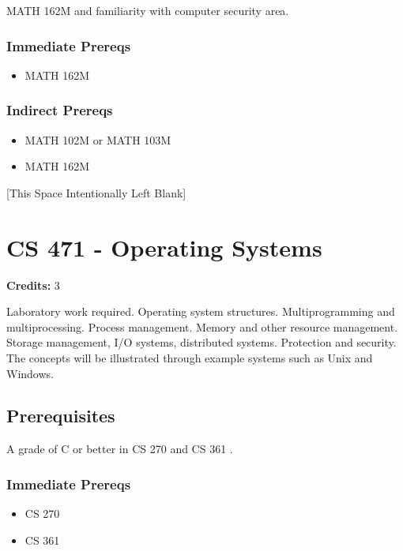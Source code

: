 \documentclass[]{article}
\providecommand{\tightlist}{%
  \setlength{\itemsep}{0pt}\setlength{\parskip}{0pt}}
\newcommand{\pagebreakhere}{
\vspace*{\fill}
\begin{center}
[This Space Intentionally Left Blank]
\end{center}
\vspace*{\fill}
\newpage
}
\begin{document}
MATH 162M and familiarity with computer security area.

\subsubsection{Immediate Prereqs}\label{immediate-prereqs-33}

\begin{itemize}
\tightlist
\item
  MATH 162M
\end{itemize}

\subsubsection{Indirect Prereqs}\label{indirect-prereqs-33}

\begin{itemize}
\tightlist
\item
  MATH 102M or MATH 103M
\item
  MATH 162M
\end{itemize}

\pagebreakhere
\section{CS 471 - Operating Systems}\label{cs-471---operating-systems}

\textbf{Credits:} 3

Laboratory work required. Operating system structures. Multiprogramming
and multiprocessing. Process management. Memory and other resource
management. Storage management, I/O systems, distributed systems.
Protection and security. The concepts will be illustrated through
example systems such as Unix and Windows.

\subsection{Prerequisites}\label{prerequisites-43}

A grade of C or better in CS 270 and CS 361 .

\subsubsection{Immediate Prereqs}\label{immediate-prereqs-34}

\begin{itemize}
\tightlist
\item
  CS 270
\item
  CS 361
\end{itemize}
\end{document}
